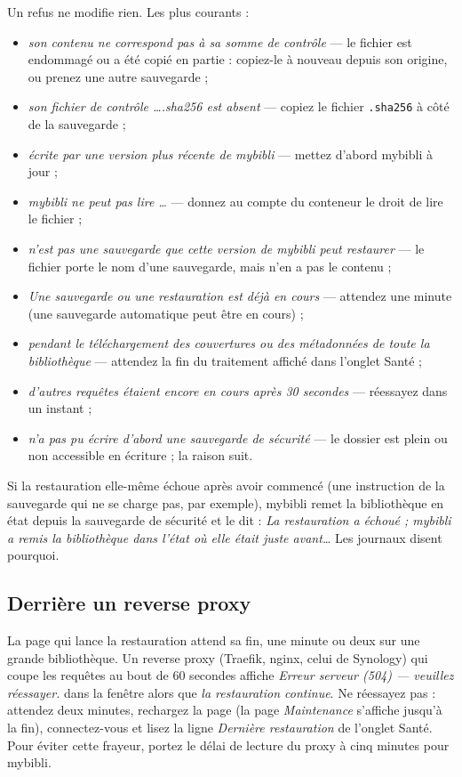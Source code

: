 Un refus ne modifie rien. Les plus courants :
\begin{itemize}
  \item \emph{son contenu ne correspond pas à sa somme de contrôle} ---
        le fichier est endommagé ou a été copié en partie : copiez-le à
        nouveau depuis son origine, ou prenez une autre sauvegarde ;
  \item \emph{son fichier de contrôle \dots.sha256 est absent} ---
        copiez le fichier \texttt{.sha256} à côté de la sauvegarde ;
  \item \emph{écrite par une version plus récente de mybibli} ---
        mettez d'abord mybibli à jour ;
  \item \emph{mybibli ne peut pas lire \dots} --- donnez au compte du
        conteneur le droit de lire le fichier ;
  \item \emph{n'est pas une sauvegarde que cette version de mybibli
        peut restaurer} --- le fichier porte le nom d'une sauvegarde,
        mais n'en a pas le contenu ;
  \item \emph{Une sauvegarde ou une restauration est déjà en cours} ---
        attendez une minute (une sauvegarde automatique peut être en
        cours) ;
  \item \emph{pendant le téléchargement des couvertures ou des
        métadonnées de toute la bibliothèque} --- attendez la fin du
        traitement affiché dans l'onglet Santé ;
  \item \emph{d'autres requêtes étaient encore en cours après 30
        secondes} --- réessayez dans un instant ;
  \item \emph{n'a pas pu écrire d'abord une sauvegarde de sécurité} ---
        le dossier est plein ou non accessible en écriture ; la raison
        suit.
\end{itemize}

Si la restauration elle-même échoue après avoir commencé (une
instruction de la sauvegarde qui ne se charge pas, par exemple), mybibli
remet la bibliothèque en état depuis la sauvegarde de sécurité et le
dit : \emph{La restauration a échoué ; mybibli a remis la bibliothèque
dans l'état où elle était juste avant\dots} Les journaux disent
pourquoi.

\subsection*{Derrière un reverse proxy}

La page qui lance la restauration attend sa fin, une minute ou deux sur
une grande bibliothèque. Un reverse proxy (Traefik, nginx, celui de
Synology) qui coupe les requêtes au bout de 60 secondes affiche
\emph{Erreur serveur (504) --- veuillez réessayer.} dans la fenêtre alors
que \emph{la restauration continue}. Ne réessayez pas : attendez deux
minutes, rechargez la page
(la page \emph{Maintenance} s'affiche jusqu'à la fin), connectez-vous et
lisez la ligne \emph{Dernière restauration} de l'onglet Santé. Pour
éviter cette frayeur, portez le délai de lecture du proxy à cinq
minutes pour mybibli.

